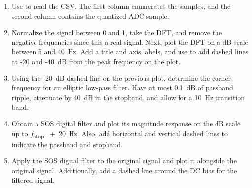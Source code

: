 \documentclass{article}
\begin{document}
\begin{enumerate}[leftmargin=*]
	\item
		Use  to read the CSV.  The
		first column enumerates the samples, and the second
		column contains the quantized ADC sample. 

	\item
		Normalize the signal between 0 and 1, take the DFT, and
		remove the negative frequencies since this a real
		signal.  Next, plot the DFT on a dB scale between 5 and
		40~Hz.  Add a title and axis labels, and use  to add dashed lines at -20 and -40~dB from the
		peak frequency on the plot.

	\item
		Using the -20~dB dashed line on the previous plot,
		determine the corner frequency for an elliptic low-pass
		filter.  Have at most 0.1~dB of passband ripple,
		attenuate by 40~dB in the stopband, and allow for a
		10~Hz transition band.

	\item
		Obtain a SOS digital filter and plot its magnitude
		response on the dB scale up to \(f\)\textsubscript{stop%
		}~+~20~Hz.  Also, add horizontal and vertical dashed
		lines to indicate the passband and stopband.

	\item
		Apply the SOS digital filter to the original signal and
		plot it alongside the original signal.  Additionally,
		add a dashed line around the DC bias for the filtered
		signal.
\end{enumerate}
\end{document}
